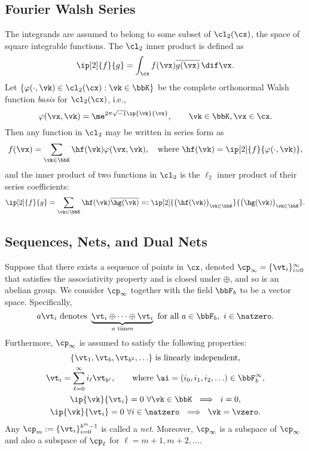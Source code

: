 \documentclass[]{elsarticle}
\theoremstyle{definition}
\begin{document}
\subsection{Fourier Walsh Series}

The integrands are assumed to belong to some subset of $\cl_2(\cx)$, the space of square integrable functions.  The $\cl_2$ inner product is defined as 
\[
\ip[2]{f}{g} = \int_{\cx} f(\vx) \overline{g(\vx)} \, \dif \vx.
\]
Let $\{\varphi(\cdot,\vk) \in \cl_2(\cx) : \vk \in \bbK\}$ be the complete orthonormal Walsh function \emph{basis} for $\cl_2(\cx)$, i.e., 
\[
\varphi(\vx,\vk)  = \me^{2 \pi \sqrt{-1} \ip{\vk}{\vx}}, \qquad \vk \in \bbK, \vx \in \cx.
\]
Then any function in $\cl_2$ may be written in series form as
\begin{equation} \label{Fourierdef}
f(\vx) = \sum_{\vk \in \bbK} \hf(\vk) \varphi(\vx,\vk), \quad \text{where } \hf(\vk) = \ip[2]{f}{\varphi(\cdot,\vk)},
\end{equation}
and the inner product of two functions in $\cl_2$ is the $\ell_2$ inner product of their series coefficients:
\[
\ip[2]{f}{g} = \sum_{\vk \in \bbK} \hf(\vk)\overline{\hg(\vk)} =: \ip[2]{\bigl(\hf(\vk)\bigr)_{\vk \in \bbK}}{\bigl ( \hg(\vk)\bigr )_{\vk \in \bbK}}.
\]

\subsection{Sequences, Nets, and Dual Nets}
Suppose that there exists a sequence of points in $\cx$, denoted $\cp_\infty =\{\vt_i\}_{i=0}^{\infty}$ that satisfies the associativity property and is closed under $\oplus$, and so is an abelian group.  We consider $\cp_\infty$ together with the field $\bbF_b$ to be a vector space.  Specifically,
\[
a \vt_i \text{ denotes } \underbrace{\vt_{i} \oplus \cdots \oplus \vt_{i}}_{a \text{ times}} \text{ for all } a \in \bbF_b, \ i  \in \natzero.
\]
Furthermore, $\cp_\infty$ is assumed to satisfy the following properties:
\begin{subequations} \label{cpinfvector}
\begin{gather}
\{\vt_1, \vt_b, \vt_{b^2}, \ldots\} \text{ is linearly independent}, \\
\vt_i = \sum_{\ell=0}^{\infty} i_\ell \vt_{b^\ell}, \qquad \text{where }\ai=(i_0, i_1, i_2, \ldots ) \in \bbF_b^\infty, \\
\ip{\vk}{\vt_i} =  0 \ \forall \vk \in \bbK \ \implies \  i=0, \\
\ip{\vk}{\vt_i} =  0 \ \forall i \in \natzero   \ \implies \ \vk=\vzero.
\end{gather}
\end{subequations}
Any $\cp_m := \{\vt_i\}_{i=0}^{b^m-1}$ is called a \emph{net}.  Moreover, $\cp_\infty$ is a subspace of $\cp_\infty$ and also a subspace of $\cp_\ell$ for $\ell=m+1, m+2, \ldots$.
\end{document}
